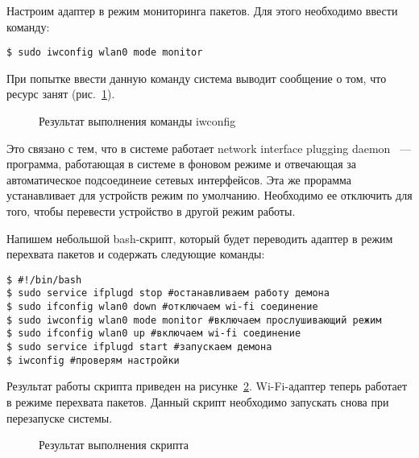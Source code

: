 Настроим адаптер в режим мониторинга пакетов. Для этого необходимо ввести команду:

\begin{verbatim}
$ sudo iwconfig wlan0 mode monitor
\end{verbatim} 

При попытке ввести данную команду система выводит сообщение о том, что ресурс занят (рис.~\ref{mm_6:mm_6}).


\begin{figure}[h!]
\center{\texttt{[image: mm\_6]}}
\caption{ Результат выполнения команды iwconfig }
\label{mm_6:mm_6}
\end{figure}

Это связано с тем, что в системе работает network interface plugging daemon~\cite{daemon} --- программа, работающая в системе в фоновом режиме и отвечающая за автоматическое подсоединеие сетевых интерфейсов. Эта же прорамма устанавливает для устройств режим по умолчанию. Необходимо ее отключить для того, чтобы перевести устройство в другой режим работы.

Напишем небольшой bash-скрипт, который будет переводить адаптер в режим перехвата пакетов и содержать следующие команды:

\begin{verbatim}
$ #!/bin/bash
$ sudo service ifplugd stop #останавливаем работу демона
$ sudo ifconfig wlan0 down #отключаем wi-fi соединение
$ sudo iwconfig wlan0 mode monitor #включаем прослушивающий режим
$ sudo ifconfig wlan0 up #включаем wi-fi соединение
$ sudo service ifplugd start #запускаем демона
$ iwconfig #проверям настройки
\end{verbatim} 

Результат работы скрипта приведен на рисунке~\ref{mm_7:mm_7}. Wi-Fi-адаптер теперь работает в режиме перехвата пакетов. Данный скрипт необходимо запускать снова при перезапуске системы.

\begin{figure}[h!]
\center{\texttt{[image: mm\_7]}}
\caption{ Результат выполнения скрипта }
\label{mm_7:mm_7}
\end{figure}

\clearpage






